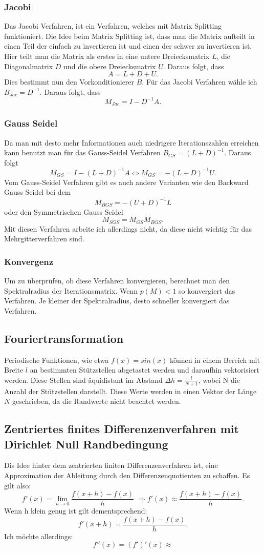 \documentclass[a4paper, 11pt]{article}
\begin{document}
                \subsubsection{Jacobi}
                 Das Jacobi Verfahren, ist ein Verfahren, welches mit Matrix Splitting funktioniert. Die Idee beim Matrix Splitting ist, dass man die Matrix aufteilt in einen Teil der einfach zu invertieren ist und einen der schwer zu invertieren ist. Hier teilt man die Matrix als erstes in eine untere Dreiecksmatrix $L$, die Diagonalmatrix $D$ und die obere Dreiecksmatrix $U$. Daraus folgt, dass $$A = L+D+U.$$ Dies bestimmt nun den Vorkonditionierer $B$. F\"{u}r das Jacobi Verfahren w\"{a}hle ich $B_{Jac}=D^{-1}$. Daraus folgt, dass $$ M_{Jac}=I-D^{-1}A.$$
                \subsubsection{Gauss Seidel}
                Da man mit desto mehr Informationen auch niedrigere Iterationszahlen erreichen kann benutzt man f\"ur das Gauss-Seidel Verfahren $B_{GS} = (L+D)^{-1}$. Daraus folgt $$M_{GS} = I-(L+D)^{-1}A \Leftrightarrow M_{GS} = -(L+D)^{-1}U.$$ Vom Gauss-Seidel Verfahren gibt es auch andere Varianten wie den Backward Gauss Seidel bei dem $$M_{BGS} = -(U+D)^{-1 }L$$ oder den Symmetrischen Gauss Seidel $$M_{SGS}= M_{GS}M_{BGS}.$$ Mit diesen Verfahren arbeite ich allerdings nicht, da diese nicht wichtig f\"{u}r das Mehrgitterverfahren sind.
                \subsubsection{Konvergenz}
                Um zu \"{u}berpr\"{u}fen, ob diese Verfahren konvergieren, berechnet man den Spektralradius der Iterationsmatrix. Wenn $p(M)<1$ so konvergiert das Verfahren. Je kleiner der Spektralradius, desto schneller konvergiert das Verfahren.
			\subsection{Fouriertransformation}            
			Periodische Funktionen, wie etwa $f(x)=sin(x)$ k\"{o}nnen in einem Bereich mit Breite $l$ an bestimmten St\"{u}tzstellen abgetastet werden und daraufhin vektorisiert werden. Diese Stellen sind \"{a}quidistant im Abstand $\Delta h=\frac{l}{N+1}$, wobei N die Anzahl der St\"{u}tzstellen darstellt. Diese Werte werden in einen Vektor der L\"{a}nge $N$ geschrieben, da die Randwerte nicht beachtet werden.
            \subsection{Zentriertes finites Differenzenverfahren mit Dirichlet Null Randbedingung}
            Dis Idee hinter dem zentrierten finiten Differenzenverfahren ist, eine Approximation der Ableitung durch den Differenzenquotienten zu schaffen. Es gilt also:$$f'(x)=\lim\limits_{h \rightarrow 0}{\frac{f(x+h)-f(x)}{h}} \; \Rightarrow f'(x)\approx\frac{f(x+h)-f(x)}{h}.$$ Wenn h klein genug ist gilt dementsprechend: $$f'(x+h)=\frac{f(x+h)-f(x)}{h}.$$ Ich m\"{o}chte allerdings: $$f''(x)=(f')'(x)\approx $$
            
\end{document}

